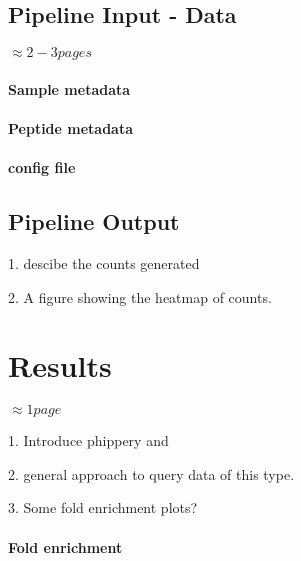 \documentclass{article}
\begin{document}
\subsection*{Pipeline Input - Data}

$\approx 2 - 3 pages$

\paragraph{Sample metadata}
\paragraph{Peptide metadata}
\paragraph{config file}

\subsection*{Pipeline Output}

1. descibe the counts generated

2. A figure showing the heatmap of counts.


\section*{Results}

$\approx 1 page$

1. Introduce phippery and 

2. general approach to query data of this type.

3. Some fold enrichment plots?


\paragraph{Fold enrichment}
\end{document}
